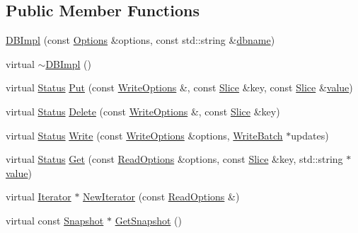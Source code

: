 \subsection*{Public Member Functions}
\begin{DoxyCompactItemize}
\item 
\hyperlink{classleveldb_1_1_d_b_impl_a269b55605b27271d6ca5fee68af0d8f3}{D\-B\-Impl} (const \hyperlink{structleveldb_1_1_options}{Options} \&options, const std\-::string \&\hyperlink{c__test_8c_a75d845559336df6843f3b599960f89d2}{dbname})
\item 
virtual \hyperlink{classleveldb_1_1_d_b_impl_a07a233a94a2531aed9d3718c9b9ed40d}{$\sim$\-D\-B\-Impl} ()
\item 
virtual \hyperlink{classleveldb_1_1_status}{Status} \hyperlink{classleveldb_1_1_d_b_impl_ad0d56aeb4d84ff9632c9a7f3f1b7c4d5}{Put} (const \hyperlink{structleveldb_1_1_write_options}{Write\-Options} \&, const \hyperlink{classleveldb_1_1_slice}{Slice} \&key, const \hyperlink{classleveldb_1_1_slice}{Slice} \&\hyperlink{cache_8cc_a0f61d63b009d0880a89c843bd50d8d76}{value})
\item 
virtual \hyperlink{classleveldb_1_1_status}{Status} \hyperlink{classleveldb_1_1_d_b_impl_af050f77e8c22bd6638fed5a46a59399d}{Delete} (const \hyperlink{structleveldb_1_1_write_options}{Write\-Options} \&, const \hyperlink{classleveldb_1_1_slice}{Slice} \&key)
\item 
virtual \hyperlink{classleveldb_1_1_status}{Status} \hyperlink{classleveldb_1_1_d_b_impl_ac0d0b472717099d6a02ad9dace4e8ef4}{Write} (const \hyperlink{structleveldb_1_1_write_options}{Write\-Options} \&options, \hyperlink{classleveldb_1_1_write_batch}{Write\-Batch} $\ast$updates)
\item 
virtual \hyperlink{classleveldb_1_1_status}{Status} \hyperlink{classleveldb_1_1_d_b_impl_a089964ddcd1f5dc85e73499ae57be508}{Get} (const \hyperlink{structleveldb_1_1_read_options}{Read\-Options} \&options, const \hyperlink{classleveldb_1_1_slice}{Slice} \&key, std\-::string $\ast$\hyperlink{cache_8cc_a0f61d63b009d0880a89c843bd50d8d76}{value})
\item 
virtual \hyperlink{classleveldb_1_1_iterator}{Iterator} $\ast$ \hyperlink{classleveldb_1_1_d_b_impl_ae955dc8f2a1c38588723a0882653cb58}{New\-Iterator} (const \hyperlink{structleveldb_1_1_read_options}{Read\-Options} \&)
\item 
virtual const \hyperlink{classleveldb_1_1_snapshot}{Snapshot} $\ast$ \hyperlink{classleveldb_1_1_d_b_impl_a4bec3d8ffd65fec562b2dd1f6eaba137}{Get\-Snapshot} ()

\end{DoxyCompactItemize}
